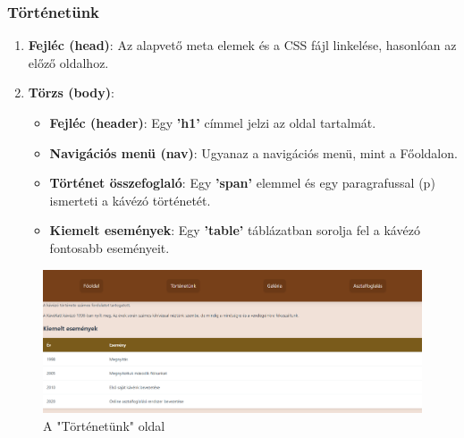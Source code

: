 \documentclass{article}
\begin{document}
\subsubsection{Történetünk}
\begin{enumerate}
	\item \textbf{Fejléc (head)}: Az alapvető meta elemek és a CSS fájl linkelése, hasonlóan az előző oldalhoz.
	\item \textbf{Törzs (body)}:
		\begin{itemize}
			\item \textbf{Fejléc (header)}: Egy \textbf{'h1'} címmel jelzi az oldal tartalmát.
			\item \textbf{Navigációs menü (nav)}: Ugyanaz a navigációs menü, mint a Főoldalon.
			\item \textbf{Történet összefoglaló}: Egy \textbf{'span'} elemmel és egy paragrafussal (p) ismerteti a kávézó történetét.
			\item \textbf{Kiemelt események}: Egy \textbf{'table'} táblázatban sorolja fel a kávézó fontosabb eseményeit.
		\end{itemize}
\end{enumerate}
\begin{figure}[H]
	\centering
	\includegraphics[width=0.9\linewidth]{story.png}
	\caption{A "Történetünk" oldal}
	\label{fig:story}
\end{figure}
\end{document}
